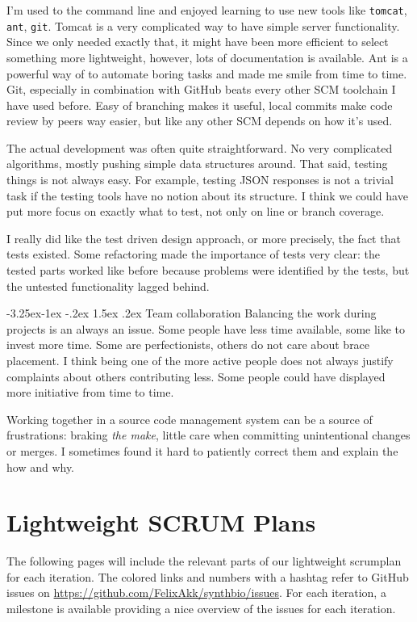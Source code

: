\documentclass[a4paper]{article}
\makeatletter
\renewcommand\paragraph{\@startsection{paragraph}{4}{\z@}%
  {-3.25ex\@plus -1ex \@minus -.2ex}%
  {1.5ex \@plus .2ex}%
  {\normalfont\normalsize\bfseries}}
\makeatother
\begin{document}
I'm used to the command line and enjoyed learning to use new tools like \verb|tomcat|, \verb|ant|, \verb|git|. Tomcat is a very complicated way to have simple server functionality. Since we only needed exactly that, it might have been more efficient to select something more lightweight, however, lots of documentation is available. Ant is a powerful way of to automate boring tasks and made me smile from time to time. Git, especially in combination with GitHub beats every other SCM toolchain I have used before. Easy of branching makes it useful, local commits make code review by peers way easier, but like any other SCM depends on how it's used.

The actual development was often quite straightforward. No very complicated algorithms, mostly pushing simple data structures around. That said, testing things is not always easy. For example, testing JSON responses is not a trivial task if the testing tools have no notion about its structure. I think we could have put more focus on exactly what to test, not only on line or branch coverage.

I really did like the test driven design approach, or more precisely, the fact that tests existed. Some refactoring made the importance of tests very clear: the tested parts worked like before because problems were identified by the tests, but the untested functionality lagged behind.

\paragraph{Team collaboration}
Balancing the work during projects is an always an issue. Some people have less time available, some like to invest more time. Some are perfectionists, others do not care about brace placement. I think being one of the more active people does not always justify complaints about others contributing less. Some people could have displayed more initiative from time to time.

Working together in a source code management system can be a source of frustrations: braking \textit{the make}, little care when committing unintentional changes or merges. I sometimes found it hard to patiently correct them and explain the how and why.



\section{Lightweight SCRUM Plans}
\label{scrumplans}
The following pages will include the relevant parts of our lightweight scrumplan for each iteration. The colored links and numbers with a hashtag refer to GitHub issues on \url{https://github.com/FelixAkk/synthbio/issues}. For each iteration, a milestone is available providing a nice overview of the issues for each iteration.
\end{document}
